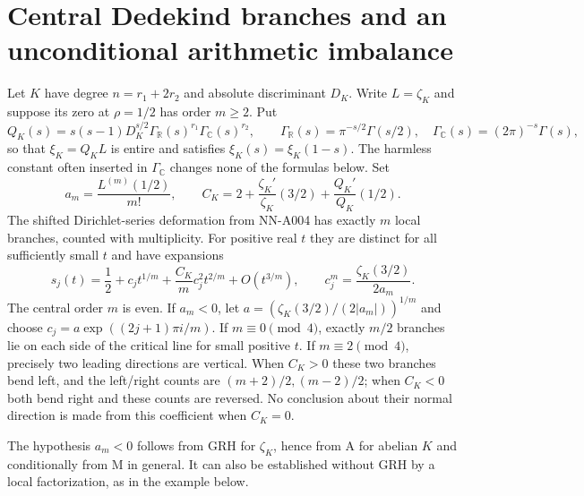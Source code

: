 \section{Central Dedekind branches and an unconditional arithmetic imbalance}
\label{sec:analytic-central-puiseux}

\begin{theorem}
Let $K$ have degree $n=r_1+2r_2$ and absolute discriminant $D_K$.
Write $L=\zeta_K$ and suppose its zero at $\rho=1/2$ has order
$m\ge2$. Put
\[
 Q_K(s)=s(s-1)D_K^{s/2}\Gamma_{\mathbb R}(s)^{r_1}
           \Gamma_{\mathbb C}(s)^{r_2},\qquad
 \Gamma_{\mathbb R}(s)=\pi^{-s/2}\Gamma(s/2),\quad
 \Gamma_{\mathbb C}(s)=(2\pi)^{-s}\Gamma(s),
\]
so that $\xi_K=Q_KL$ is entire and satisfies
$\xi_K(s)=\xi_K(1-s)$. The harmless constant often inserted in
$\Gamma_{\mathbb C}$ changes none of the formulas below. Set
\[
 a_m=\frac{L^{(m)}(1/2)}{m!},\qquad
 C_K=2+\frac{\zeta_K'}{\zeta_K}(3/2)
                 +\frac{Q_K'}{Q_K}(1/2).
\]
The shifted Dirichlet-series deformation from NN-A004 has exactly $m$
local branches, counted with multiplicity. For positive real $t$ they
are distinct for all sufficiently small $t$ and have expansions
\begin{equation}\label{eq:central-second-jet}
 s_j(t)=\frac12+c_jt^{1/m}
              +\frac{C_K}{m}c_j^2t^{2/m}+O(t^{3/m}),\qquad
 c_j^m=\frac{\zeta_K(3/2)}{2a_m}.
\end{equation}
The central order $m$ is even. If $a_m<0$, let
$a=(\zeta_K(3/2)/(2|a_m|))^{1/m}$ and choose
$c_j=a\exp((2j+1)\pi i/m)$. If $m\equiv0\pmod4$, exactly $m/2$
branches lie on each side of the critical line for small positive $t$.
If $m\equiv2\pmod4$, precisely two leading directions are vertical.
When $C_K>0$ these two branches bend left, and the left/right counts
are $(m+2)/2,(m-2)/2$; when $C_K<0$ both bend right and these counts
are reversed. No conclusion about their normal direction is made
from this coefficient when $C_K=0$.

The hypothesis $a_m<0$ follows from GRH for $\zeta_K$, hence from A
for abelian $K$ and conditionally from M in general. It can also be
established without GRH by a local factorization, as in the example
below.
\end{theorem}


